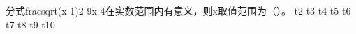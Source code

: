 \markdownRendererDocumentBegin
\markdownRendererOlBeginTight
{}分式\markdownRendererDollarSign{}\markdownRendererBackslash{}frac\markdownRendererLeftBrace{}\markdownRendererBackslash{}sqrt\markdownRendererLeftBrace{}(x-1)\markdownRendererCircumflex{}2-9\markdownRendererRightBrace{}\markdownRendererRightBrace{}\markdownRendererLeftBrace{}x-4\markdownRendererRightBrace{}\markdownRendererDollarSign{}在实数范围内有意义，则\markdownRendererDollarSign{}x\markdownRendererDollarSign{}取值范围为（\markdownRendererTilde{}\markdownRendererTilde{}\markdownRendererTilde{}）。\markdownRendererOlItemEnd
{}t2\markdownRendererOlItemEnd
{}t3\markdownRendererOlItemEnd
{}t4\markdownRendererOlItemEnd
{}t5\markdownRendererOlItemEnd
{}t6\markdownRendererOlItemEnd
{}t7\markdownRendererOlItemEnd
{}t8\markdownRendererOlItemEnd
{}t9\markdownRendererOlItemEnd
{}t10\markdownRendererOlItemEnd
\markdownRendererOlEndTight \markdownRendererDocumentEnd